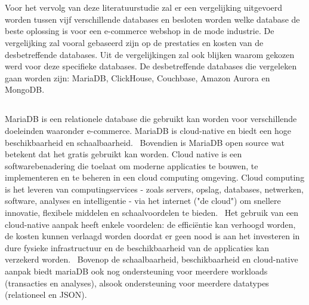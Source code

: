 \chapter{}%
\label{ch:vergelijkende-studie}

\section{}%
\label{sec:}

Voor het vervolg van deze literatuurstudie zal er een vergelijking uitgevoerd worden tussen vijf verschillende databases en besloten worden welke database de beste oplossing is voor een e-commerce webshop in de mode industrie. De vergelijking zal vooral gebaseerd zijn op de prestaties en kosten van de desbetreffende databases. Uit de vergelijkingen zal ook blijken waarom gekozen werd voor deze specifieke databases. De desbetreffende databases die vergeleken  gaan worden zijn: MariaDB, ClickHouse, Couchbase, Amazon Aurora en MongoDB.

\section{}%
\label{sec:MariaDB}

MariaDB is een relationele database die gebruikt kan worden voor verschillende doeleinden waaronder e-commerce. MariaDB is cloud-native  en biedt een hoge beschikbaarheid en schaalbaarheid.~\autocite{MariaDB} Bovendien is MariaDB open source wat betekent dat het gratis gebruikt kan worden. Cloud native is een softwarebenadering die toelaat om moderne applicaties te bouwen, te implementeren en te beheren in een cloud computing omgeving. Cloud computing is het leveren van computingservices - zoals servers, opslag, databases, netwerken, software, analyses en intelligentie - via het internet ("de cloud") om snellere innovatie, flexibele middelen en schaalvoordelen te bieden.~\autocite{Microsofta} Het gebruik van een cloud-native aanpak heeft enkele voordelen: de efficiëntie kan verhoogd worden, de kosten kunnen verlaagd worden doordat er geen nood is aan het investeren in dure fysieke infrastructuur en de beschikbaarheid van de applicaties kan verzekerd worden.~\autocite{Amazona} Bovenop de schaalbaarheid, beschikbaarheid en cloud-native aanpak biedt mariaDB ook nog ondersteuning voor meerdere workloads (transacties en analyses), alsook ondersteuning voor meerdere datatypes (relationeel en JSON).

